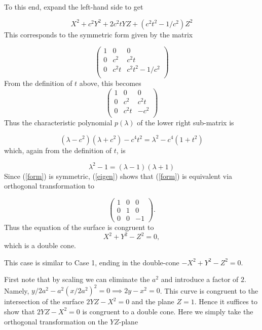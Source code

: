 \documentclass[12pt]{article}
\begin{document}
To this end, expand the left-hand side to get

$$X^2 + c^2 Y^2 + 2c^2t YZ + (c^2t^2 - 1/c^2 )Z^2$$
This corresponds to the symmetric form given by the matrix 

\begin{equation}\label{form}\left(
\begin{matrix} 
1 & 0 & 0 \\
0 & c^2 & c^2t \\
0 & c^2 t& c^2t^2 - 1/c^2 \\
\end{matrix}
\right)
\end{equation} 
From the definition of $t$ above, this becomes
$$\left(
\begin{matrix}
1 & 0 & 0 \\
0 & c^2 & c^2 t\\
0 & c^2 t& -c^2\\
\end{matrix}
\right)$$
Thus the characteristic polynomial $p(\lambda)$ of the lower right sub-matrix is

$$( \lambda - c^2)(\lambda + c^2) -  c^4 t^2 = \lambda^2 - c^4(1 + t^2)$$
which, again from the definition of $t$, is

\begin{equation}\label{eigen} \lambda^2  -1 = (\lambda - 1)(\lambda + 1)\end{equation}
Since (\ref{form}) is symmetric, (\ref{eigen}) shows that (\ref{form}) is
equivalent via orthogonal transformation to

$$\left(\begin{matrix}1 & 0 & 0 \\
0 & 1 & 0\\
0 & 0 & -1\end{matrix}\right).$$
Thus the equation of the surface is congruent to
$$X^2 + Y^2 - Z^2 = 0,$$
which is a double cone.

\medskip

 This case is similar to Case 1, ending in the
double-cone $-X^2 + Y^2 - Z^2 = 0$.

\medskip

 First note that by scaling 
we can eliminate the $a^2$ and introduce a factor of $2$.  Namely,
$y/2a^2 - a^2(x/2a^2)^2  = 0\implies 2y
- x^2 = 0$.  This curve is congruent to the intersection of
the surface $2YZ - X^2 = 0$ and the plane $Z = 1$.  Hence it suffices
to show that $2YZ - X^2 = 0$ is congruent to a double cone.  
Here we simply take the orthogonal transformation on the
$YZ$-plane
\end{document}
